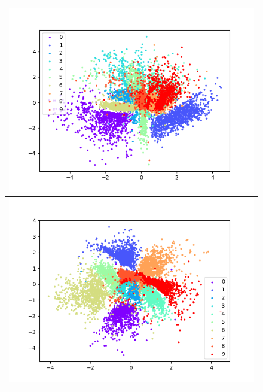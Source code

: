 \documentclass[letterpaper, twoside]{article}
\begin{document}
      \begin{figure}[h]
        \centering
        \begin{minipage}{.5\textwidth}
        \centering
        \begin{tabular}{|@{}c@{}|}\hline
        \includegraphics[scale=0.5]{dist_val_118.png}\\\hline
        \includegraphics[scale=0.5]{dist_val_132.png}\\ \hline
        \end{tabular}
        \end{minipage}%
        \begin{minipage}{.5\textwidth}
        \centering
        \begin{tabular}{|@{}c@{}|}\hline

\end{tabular}
\end{minipage}
\end{figure}
\end{document}
